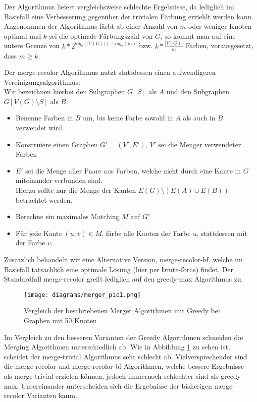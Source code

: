 \documentclass[11pt]{article}
\begin{document}
Der Algorithmus liefert vergleichsweise schlechte Ergebnisse, 
da lediglich im Basisfall eine Verbesserung gegenüber der trivialen Färbung erziehlt werden kann.
Angenommen der Algorithmus färbt ab einer Anzahl von $m$ oder weniger Knoten optimal
und $k$ sei die optimale Färbungszahl von $G$, so kommt man auf eine untere Grenze von 
$k*2^{log_2(|V(G)|)-log_2(m)}$ bzw. $k*\frac{|V(G)|}{m}$ Farben, vorausgesetzt, dass $m\geq k$.\par

Der merge-recolor Algorithmus nutzt stattdessen einen aufwendigeren Vereinigungsalgorithmus:\\
Wir bezeichnen hierbei den Subgraphen $G[S]$ als $A$ und den Subgraphen $G[V(G)\setminus S]$ als $B$
\begin{itemize}
\item[1.] Benenne Farben in $B$ um, bis keine Farbe sowohl in $A$ als auch in $B$ verwendet wird.
\item[2.] Konstruiere einen Graphen $G'=(V',E')$, $V'$ sei die Menger verwendeter Farben
\item[3.] $E'$ sei die Menge aller Paare aus Farben, welche nicht durch eine Kante in $G$ miteinander verbunden sind. \\Hierzu sollte nur die Menge der Kanten $E(G)\setminus (E(A)\cup E(B))$ betrachtet werden.
\item[4.] Berechne ein maximales Matching $M$ auf $G'$
\item[5.] Für jede Kante $(u,v)\in M$, färbe alle Knoten der Farbe $u$, stattdessen mit der Farbe $v$.
\end{itemize}

Zusätzlich behandeln wir eine Alternative Version, merge-recolor-bf, welche im Basisfall tatsächlich eine optimale Lösung (hier per \textbf{b}rute-\textbf{f}orce) findet.
Der Standardfall merge-recolor greift lediglich auf den greedy-max Algorithmus zu.

\begin{figure}
  \texttt{[image: diagrams/merger\_pic1.png]}
  \caption{Vergleich der beschriebenen Merger Algorithmen mit Greedy bei Graphen mit 50 Knoten}
  \label{fig:merge1}
\end{figure}

Im Vergleich zu den besseren Varianten der Greedy Algorithmen schneiden die Merging Algorithmen unterschiedlich ab. Wie in Abbildung \ref{fig:merge1} zu sehen ist, scheidet der merge-trivial Algorithmus sehr schlecht ab.
Vielversprechender sind die merge-recolor und merge-recolor-bf Algorithmen, welche bessere Ergebnisse als merge-trivial erzielen können, jedoch immernoch schlechter sind als greedy-max. Untereinander unterscheiden sich die Ergebnisse der bisherigen merge-recolor Varianten kaum.
\end{document}
